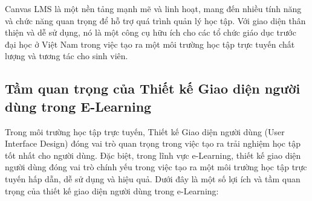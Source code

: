 \documentclass[../Thesis.tex]{subfiles}
\begin{document}
	Canvas LMS là một nền tảng mạnh mẽ và linh hoạt, mang đến nhiều tính năng và chức năng quan trọng để hỗ trợ quá trình quản lý học tập. Với giao diện thân thiện và dễ sử dụng, nó là một công cụ hữu ích cho các tổ chức giáo dục trước đại học ở Việt Nam trong việc tạo ra một môi trường học tập trực tuyến chất lượng và tương tác cho sinh viên.

	\subsection{Tầm quan trọng của Thiết kế Giao diện người dùng trong E-Learning}
	Trong môi trường học tập trực tuyến, Thiết kế Giao diện người dùng (User Interface Design) đóng vai trò quan trọng trong việc tạo ra trải nghiệm học tập tốt nhất cho người dùng. Đặc biệt, trong lĩnh vực e-Learning, thiết kế giao diện người dùng đóng vai trò chính yếu trong việc tạo ra một môi trường học tập trực tuyến hấp dẫn, dễ sử dụng và hiệu quả. Dưới đây là một số lợi ích và tầm quan trọng của thiết kế giao diện người dùng trong e-Learning:
\end{document}

